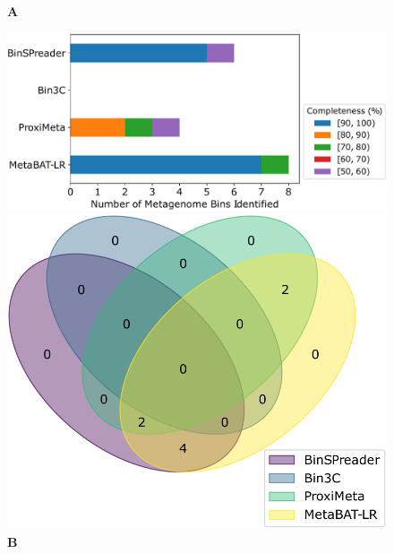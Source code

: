 \documentclass[fleqn,10pt,lineno]{wlpeerj}
\begin{document}
\begin{figure}[ht!]
    \centering
    
    \begin{minipage}[t]{0.50\textwidth}
        \captionsetup{justification=raggedright, singlelinecheck=false, labelformat=empty,font=large}
        \caption*{\textbf{A}}
        \includegraphics[scale=0.42]{synthetic_amber_stacked_cropped.pdf}
    \end{minipage}
    \hfill
    \begin{minipage}[t]{0.42\textwidth}
        \captionsetup{justification=raggedright, singlelinecheck=false, labelformat=empty,font=large}
        \caption*{\textbf{B}}
        \includegraphics[scale=0.42]{synthetic_amber_filtered_venn4_cropped.pdf}
    \end{minipage}
    \hfill


\end{figure}
\end{document}
